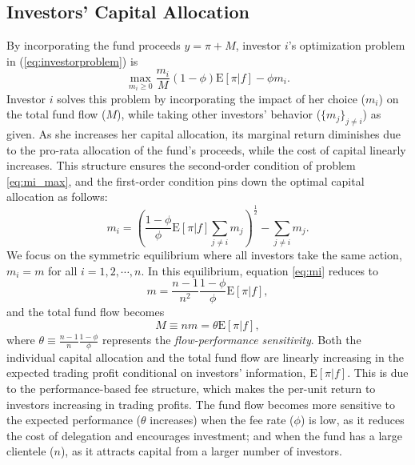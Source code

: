 \subsection{Investors' Capital Allocation} \label{ss:delegation}
By incorporating the fund proceeds $y = \pi + M$, investor $i$'s optimization problem in (\ref{eq:investorproblem}) is 
\begin{equation}
    \max_{m_i\ge 0} \frac{m_i}{M}(1-\phi)\mathrm{E}\left[\pi|f\right]-\phi m_i.\label{eq:mi_max}
\end{equation}
Investor $i$ solves this problem by incorporating the impact of her choice ($m_i$) on the total fund flow ($M$), while taking other investors' behavior ($\{m_j\}_{j\neq i}$) as given. As she increases her capital allocation, its marginal return diminishes due to the pro-rata allocation of the fund's proceeds, while the cost of capital linearly increases. This structure ensures the second-order condition of problem \eqref{eq:mi_max}, and the first-order condition pins down the optimal capital allocation as follows:
\begin{equation}
    m_{i}= \left(\frac{1-\phi}{\phi}\mathrm{E}[\pi|f]\sum_{j\neq i}m_j\right)^{\frac{1}{2}} -\sum_{j\neq i}m_j.
    \label{eq:mi}
\end{equation}
We focus on the symmetric equilibrium where all investors take the same action, $m_i = m$ for all $i=1,2,\cdots,n$. In this equilibrium, equation \eqref{eq:mi} reduces to 
\begin{equation}
    m = \frac{n-1}{n^2}\frac{1-\phi}{\phi}\mathrm{E}[\pi|f],\label{eq:m_sym}
\end{equation}
and the total fund flow becomes
\begin{equation}
    M \equiv n m = \theta \mathrm{E}[\pi|f],\label{eq:M_sym}
\end{equation}
where $\theta \equiv \frac{n-1}{n}\frac{1-\phi}{\phi}$ represents the \textit{flow-performance sensitivity}.  
Both the individual capital allocation and the total fund flow are linearly increasing in the expected trading profit conditional on investors' information, $\mathrm{E}[\pi|f]$. This is due to the performance-based fee structure, which makes the per-unit return to investors increasing in trading profits. The fund flow becomes more sensitive to the expected performance ($\theta$ increases) when the fee rate ($\phi$) is low, as it reduces the cost of delegation and encourages investment; and when the fund has a large clientele ($n$), as it attracts capital from a larger number of  investors.

